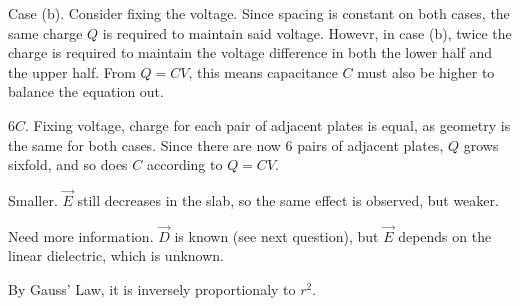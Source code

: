 \documentclass[answers]{exam}
\begin{document}
\begin{questions}
\begin{solution}
	Case (b). Consider fixing the voltage. Since spacing is constant on both cases, the same charge $Q$ is required to maintain said voltage. Howevr, in case (b), twice the charge is required to maintain the voltage difference in both the lower half and the upper half. From $Q=CV$, this means capacitance $C$ must also be higher to balance the equation out.
\end{solution}


\begin{solution}
	$6C$. Fixing voltage, charge for each pair of adjacent plates is equal, as geometry is the same for both cases. Since there are now 6 pairs of adjacent plates, $Q$ grows sixfold, and so does $C$ according to $Q=CV$.
\end{solution}


\begin{solution}
	Smaller. $\vec{E}$ still decreases in the slab, so the same effect is observed, but weaker.
\end{solution}


\begin{solution}
	Need more information. $\vec{D}$ is known (see next question), but $\vec{E}$ depends on the linear dielectric, which is unknown.
\end{solution}


\begin{solution}
	By Gauss' Law, it is inversely proportionaly to $r^2$.
\end{solution}


\end{questions}
\end{document}
